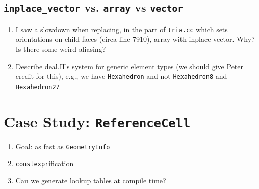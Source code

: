 \documentclass[11pt]{article}
\begin{document}
\subsection{\texttt{inplace\_vector} vs. \texttt{array} vs \texttt{vector}}
\begin{enumerate}
  \item I saw a slowdown when replacing, in the part of \texttt{tria.cc} which
    sets orientations on child faces (circa line 7910), array with inplace
    vector. Why? Is there some weird aliasing?

  \item Describe deal.II's system for generic element types (we should give
    Peter credit for this), e.g., we have \texttt{Hexahedron} and not
    \texttt{Hexahedron8} and \texttt{Hexahedron27}
\end{enumerate}

\section{Case Study: \texttt{ReferenceCell}}
\begin{enumerate}
  \item Goal: as fast as \texttt{GeometryInfo}

  \item \texttt{constexpr}ification

  \item Can we generate lookup tables at compile time?
\end{enumerate}
\end{document}
